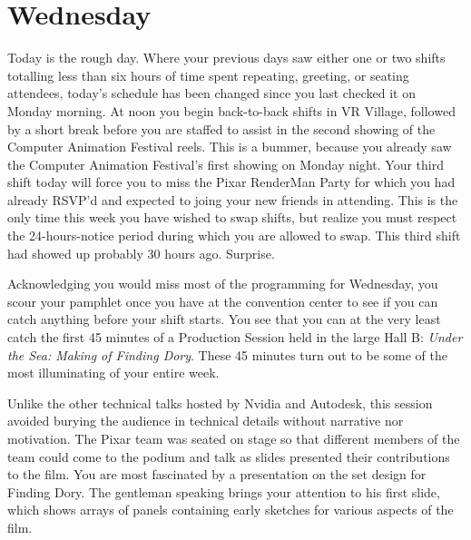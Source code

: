 \documentclass[../main.tex]{subfiles}
\begin{document}
\section{Wednesday}

Today is the rough day. Where your previous days saw either one or two shifts totalling less than six hours of time spent repeating, greeting, or seating attendees, today's schedule has been changed since you last checked it on Monday morning. At noon you begin back-to-back shifts in VR Village, followed by a short break before you are staffed to assist in the second showing of the Computer Animation Festival reels. This is a bummer, because you already saw the Computer Animation Festival's first showing on Monday night. Your third shift today will force you to miss the Pixar RenderMan Party for which you had already RSVP'd and expected to joing your new friends in attending. This is the only time this week you have wished to swap shifts, but realize you must respect the 24-hours-notice period during which you are allowed to swap. This third shift had showed up probably 30 hours ago. Surprise.

Acknowledging you would miss most of the programming for Wednesday, you scour your pamphlet once you have at the convention center to see if you can catch anything before your shift starts.  You see that you can at the very least catch the first 45 minutes of a Production Session held in the large Hall B: \textit{Under the Sea: Making of Finding Dory}. These 45 minutes turn out to be some of the most illuminating of your entire week.

Unlike the other technical talks hosted by Nvidia and Autodesk, this session avoided burying the audience in technical details without narrative nor motivation. The Pixar team was seated on stage so that different members of the team could come to the podium and talk as slides presented their contributions to the film. You are most fascinated by a presentation on the set design for Finding Dory. The gentleman speaking brings your attention to his first slide, which shows arrays of panels containing early sketches for various aspects of the film.
\end{document}
